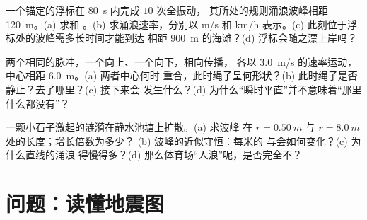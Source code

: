 \begin{exercise}[$\star\star\star$]\label{exo:g12:mechanical-waves:13}
一个锚定的浮标在 \qty{80}{s} 内完成 $10$ 次全振动，
其所处的规则涌浪波峰相距 \qty{120}{m}。(a) 求和
。(b) 求涌浪速率，分别以 \unit{m/s} 和
\unit{km/h} 表示。(c) 此刻位于浮标处的波峰需多长时间才能到达
相距 \qty{900}{m} 的海滩？(d) 浮标会随之漂上岸吗？
\end{exercise}

\begin{exercise}[$\star\star\star$]\label{exo:g12:mechanical-waves:14}
两个相同的脉冲，一个向上、一个向下，相向传播，
各以 \qty{3.0}{m/s} 的速率运动，中心相距 \qty{6.0}{m}。(a) 两者中心何时
重合，此时绳子呈何形状？(b) 此时绳子是否
静止？去了哪里？(c) 接下来会
发生什么？(d) 为什么“瞬时平直”并不意味着“那里什么都没有”？
\end{exercise}

\begin{exercise}[$\star\star\star$]\label{exo:g12:mechanical-waves:15}
一颗小石子激起的涟漪在静水池塘上扩散。(a) 求波峰
在 $r = \qty{0.50}{m}$ 与 $r = \qty{8.0}{m}$ 处的长度；增长倍数为多少？
(b) 波峰的近似守恒：每米的
与会如何变化？(c) 为什么直线的涌浪
得慢得多？(d) 那么体育场“人浪”呢，是否完全不？
\end{exercise}

\section{问题：读懂地震图}

